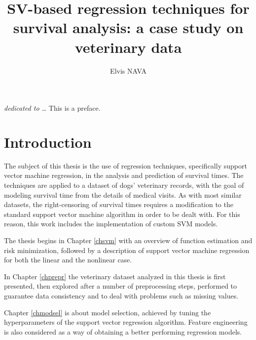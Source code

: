 \documentclass[12pt]{report}
\begin{document}
\title{SV-based regression techniques for survival analysis: a case study on veterinary data}
\author{Elvis NAVA}
%
% 
%
\beforepreface
{}
\vspace*{\fill}
{\hfill \Large {\sl dedicated to \dots}}
\vspace*{\fill}
% 
%
This is a preface.
%
%

\afterpreface


\chapter*{Introduction}
\label{intro}
The subject of this thesis is the use of regression techniques, specifically support vector machine regression, in the analysis and prediction of survival times. The techniques are applied to a dataset of dogs' veterinary records, with the goal of modeling survival time from the details of medical visits. As with most similar datasets, the right-censoring of survival times requires a modification to the standard support vector machine algorithm in order to be dealt with. For this reason, this work includes the implementation of custom SVM models.

The thesis begins in Chapter \ref{chsvm} with an overview of function estimation and risk minimization, followed by a description of support vector machine regression for both the linear and the nonlinear case.

In Chapter \ref{chprepr} the veterinary dataset analyzed in this thesis is first presented, then explored after a number of preprocessing steps, performed to guarantee data consistency and to deal with problems such as missing values.

Chapter \ref{chmodsel} is about model selection, achieved by tuning the hyperparameters of the support vector regression algorithm. Feature engineering is also considered as a way of obtaining a better performing regression models.
\end{document}
